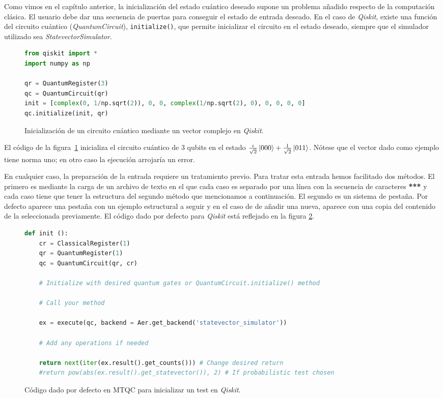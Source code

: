 Como vimos en el capítulo anterior, la inicialización del estado cuántico deseado supone un problema añadido respecto de la computación clásica. El usuario debe dar una secuencia de puertas para conseguir el estado de entrada deseado. En el caso de \textit{Qiskit}, existe una función del circuito cuántico (\textit{QuantumCircuit}), \texttt{initialize()}, que permite inicializar el circuito en el estado deseado, siempre que el simulador utilizado sea \textit{StatevectorSimulator}.

\begin{figure}[t]
\begin{lstlisting}[language=Python]
from qiskit import *
import numpy as np

qr = QuantumRegister(3)
qc = QuantumCircuit(qr)
init = [complex(0, 1/np.sqrt(2)), 0, 0, complex(1/np.sqrt(2), 0), 0, 0, 0, 0]
qc.initialize(init, qr)
\end{lstlisting}
\caption{Inicialización de un circuito cuántico mediante un vector complejo en \textit{Qiskit}.}
\label{fig:code2}
\end{figure}

El código de la figura~\ref{fig:code2} inicializa el circuito cuántico de $3$ qubits en el estado $\frac{i}{\sqrt{2}}\left|000\right\rangle+\frac{1}{\sqrt{2}}\left|011\right\rangle$. Nótese que el vector dado como ejemplo tiene norma uno; en otro caso la ejecución arrojaría un error.

En cualquier caso, la preparación de la entrada requiere un tratamiento previo. Para tratar esta entrada hemos facilitado dos métodos. El primero es mediante la carga de un archivo de texto en el que cada caso es separado por una línea con la secuencia de caracteres \textbf{***} y cada caso tiene que tener la estructura del segundo método que mencionamos a continuación. El segundo es un sistema de pestaña. Por defecto aparece una pestaña con un ejemplo estructural a seguir y en el caso de de añadir una nueva, aparece con una copia del contenido de la seleccionada previamente. El código dado por defecto para \textit{Qiskit} está reflejado en la figura \ref{fig:code3}.

\begin{figure}[bt]
\begin{lstlisting}[language=Python]
def init ():
	cr = ClassicalRegister(1)
	qr = QuantumRegister(1)
	qc = QuantumCircuit(qr, cr)

	# Initialize with desired quantum gates or QuantumCircuit.initialize() method

	# Call your method

	ex = execute(qc, backend = Aer.get_backend('statevector_simulator'))

	# Add any operations if needed
	
	return next(iter(ex.result().get_counts())) # Change desired return
	#return pow(abs(ex.result().get_statevector()), 2) # If probabilistic test chosen
\end{lstlisting}
\caption{Código dado por defecto en MTQC para inicializar un test en \textit{Qiskit}.}
\label{fig:code3}
\end{figure}

